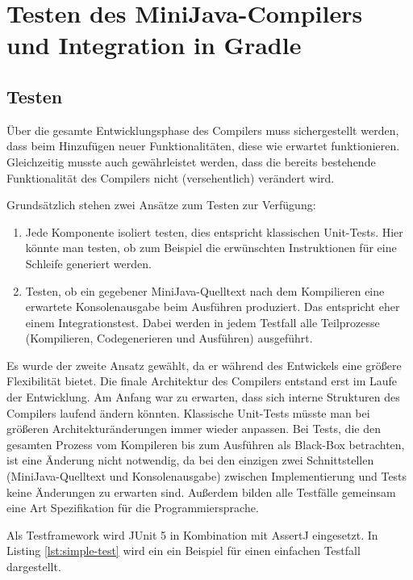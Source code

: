 \chapter{Testen des MiniJava-Compilers und Integration in Gradle}
\label{cha:Testen-des-Compilers}

\section{Testen}

Über die gesamte Entwicklungsphase des Compilers muss sichergestellt werden, dass beim Hinzufügen neuer Funktionalitäten, diese wie erwartet funktionieren. Gleichzeitig musste auch gewährleistet werden, dass die bereits bestehende Funktionalität des Compilers nicht (versehentlich) verändert wird.

Grundsätzlich stehen zwei Ansätze zum Testen zur Verfügung:
\begin{enumerate}
    \item Jede Komponente isoliert testen, dies entspricht klassischen Unit-Tests. Hier könnte man testen, ob zum Beispiel die erwünschten Instruktionen für eine Schleife generiert werden. 
    \item Testen, ob ein gegebener MiniJava-Quelltext nach dem Kompilieren eine erwartete Konsolenausgabe beim Ausführen produziert. Das entspricht eher einem Integrationstest. Dabei werden in jedem Testfall alle Teilprozesse (Kompilieren, Codegenerieren und Ausführen) ausgeführt.
\end{enumerate}

Es wurde der zweite Ansatz gewählt, da er während des Entwickels eine größere Flexibilität bietet. Die finale Architektur des Compilers entstand erst im Laufe der Entwicklung. Am Anfang war zu erwarten, dass sich interne Strukturen des Compilers laufend ändern könnten. Klassische Unit-Tests müsste man bei größeren Architekturänderungen immer wieder anpassen. Bei Tests, die den gesamten Prozess vom Kompileren bis zum Ausführen als Black-Box betrachten, ist eine Änderung nicht notwendig, da bei den einzigen zwei Schnittstellen (MiniJava-Quelltext und Konsolenausgabe) zwischen Implementierung und Tests keine Änderungen zu erwarten sind. Außerdem bilden alle Testfälle gemeinsam eine Art Spezifikation für die Programmiersprache.

Als Testframework wird JUnit 5 \cite{JUnit} in Kombination mit AssertJ \cite{AssertJ} eingesetzt. In Listing \ref{lst:simple-test} wird ein ein Beispiel für einen einfachen Testfall dargestellt.

